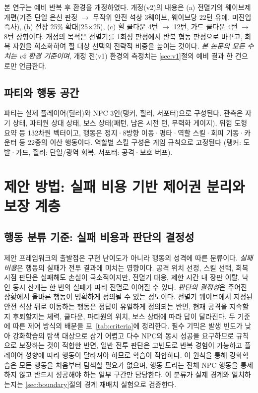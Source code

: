 \documentclass[12pt]{article}      %
\begin{document}
본 연구는 예비 반복 후 환경을 개정하였다. 개정(v2)의 내용은 (a) 전멸기의 웨이브제
개편(기존 단일 은신 판정 $\rightarrow$ 무작위 안전 석상 3웨이브, 웨이브당 22턴
유예, 미진입 즉사), (b) 전장 25\% 확대(25$\times$25), (c) 힐 쿨다운 4턴
$\rightarrow$ 12턴, 가드 쿨다운 4턴 $\rightarrow$ 8턴 상향이다. 개정의 목적은
전멸기를 1회성 판정에서 반복 협동 판정으로 바꾸고, 회복 자원을 희소화하여 힐
대상 선택의 전략적 비중을 높이는 것이다. \emph{본 논문의 모든 수치는 v2 환경
기준이며}, 개정 전(v1) 환경의 측정치는 \ref{sec:v1}절의 예비 결과 한 건으로만
언급한다.

\subsection{파티와 행동 공간}

파티는 실제 플레이어(딜러)와 NPC 3인(탱커, 힐러, 서포터)으로 구성된다. 관측은
자기 상태, 파티원 상대 상태, 보스 상태(패턴, 남은 시전 턴, 무력화 게이지), 위험
도형 요약 등 132차원 벡터이고, 행동은 정지·8방향 이동·평타·역할 스킬·회피
기동·카운터 등 22종의 이산 행동이다. 역할별 스킬 구성은 게임 규칙으로 고정된다
(탱커: 도발·가드, 힐러: 단일/광역 회복, 서포터: 공격·보호 버프).

\section{제안 방법: 실패 비용 기반 제어권 분리와 보장 계층}

\subsection{행동 분류 기준: 실패 비용과 판단의 결정성}

제안 프레임워크의 출발점은 구현 난이도가 아니라 행동의 성격에 따른 분류이다.
\emph{실패 비용}은 행동의 실패가 전투 결과에 미치는 영향이다. 공격 위치 선정,
스킬 선택, 회복 시점 판단은 실패해도 손실이 국소적이지만, 전멸기 대응, 제한 시간
내 장판 이탈, 낙인 동시 산개는 한 번의 실패가 파티 전멸로 이어질 수 있다.
\emph{판단의 결정성}은 주어진 상황에서 올바른 행동이 명확하게 정의될 수 있는
정도이다. 전멸기 웨이브에서 지정된 안전 석상 뒤로 이동하는 행동은 정답이 유일하게
정의되는 반면, 현재 공격을 지속할지 후퇴할지는 체력, 쿨다운, 파티원의 위치, 보스
상태에 따라 답이 달라진다. 두 기준에 따른 제어 방식의 배분을
표~\ref{tab:criteria}에 정리한다. 필수 기믹은 발생 빈도가 낮아 강화학습의 탐색
대상으로 삼기 어렵고 다수 NPC의 동시 성공을 요구하므로 규칙으로 보장하는 것이
적합한 반면, 일반 전투 판단은 고빈도로 반복 경험이 가능하고 플레이어 성향에 따라
행동이 달라져야 하므로 학습이 적합하다. 이 원칙을 통해 강화학습은 모든 행동을
처음부터 탐색할 필요가 없으며, 행동 트리는 전체 NPC 행동을 통제하지 않고 반드시
성공해야 하는 일부 구간만 담당한다. 이 분류가 실제 경계와 일치하는지는
\ref{sec:boundary}절의 경계 재배치 실험으로 검증한다.
\end{document}
